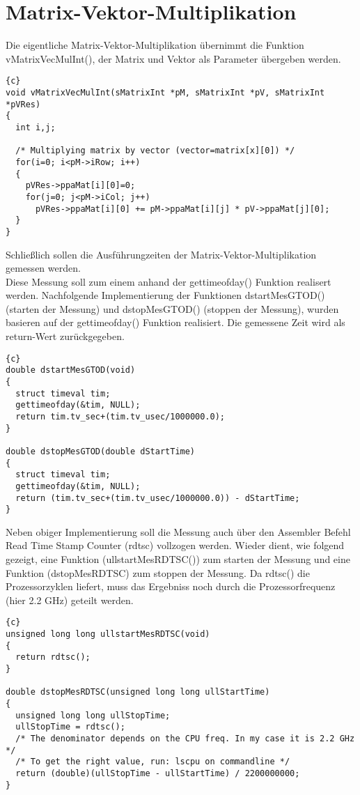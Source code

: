 \documentclass{article}
\newcommand{\enterProblemHeader}[1]{
}
\newcommand{\exitProblemHeader}[1]{
}
\newcounter{homeworkProblemCounter} %
\newcommand{\homeworkProblemName}{}
\newenvironment{homeworkProblem}[1][Problem \arabic{homeworkProblemCounter}]{ %
\stepcounter{homeworkProblemCounter} %
\renewcommand{\homeworkProblemName}{#1} %
\section{\homeworkProblemName} %
}{
}
\begin{document}
\begin{homeworkProblem}[Matrix-Vektor-Multiplikation]
Die eigentliche Matrix-Vektor-Multiplikation übernimmt die Funktion vMatrixVecMulInt(),
der Matrix und Vektor als Parameter übergeben werden.
\begin{lstlisting}{c}
void vMatrixVecMulInt(sMatrixInt *pM, sMatrixInt *pV, sMatrixInt *pVRes)
{
  int i,j;
  
  /* Multiplying matrix by vector (vector=matrix[x][0]) */
  for(i=0; i<pM->iRow; i++)
  {
    pVRes->ppaMat[i][0]=0;
    for(j=0; j<pM->iCol; j++)
      pVRes->ppaMat[i][0] += pM->ppaMat[i][j] * pV->ppaMat[j][0];
  }
}
\end{lstlisting}
Schließlich sollen die Ausführungzeiten der Matrix-Vektor-Multiplikation gemessen werden.
\\
Diese Messung soll zum einem anhand der gettimeofday() Funktion realisert werden. Nachfolgende
Implementierung der Funktionen dstartMesGTOD() (starten der Messung) und dstopMesGTOD()
(stoppen der Messung), wurden basieren auf der gettimeofday() Funktion realisiert. Die
gemessene Zeit wird als return-Wert zurückgegeben.
\begin{lstlisting}{c}
double dstartMesGTOD(void)
{
  struct timeval tim;
  gettimeofday(&tim, NULL);
  return tim.tv_sec+(tim.tv_usec/1000000.0);
}

double dstopMesGTOD(double dStartTime)
{
  struct timeval tim;
  gettimeofday(&tim, NULL);
  return (tim.tv_sec+(tim.tv_usec/1000000.0)) - dStartTime;
}
\end{lstlisting}
Neben obiger Implementierung soll die Messung auch über den Assembler Befehl Read Time
Stamp Counter (rdtsc) vollzogen werden. Wieder dient, wie folgend gezeigt, eine Funktion
(ullstartMesRDTSC()) zum starten der Messung und eine Funktion (dstopMesRDTSC) zum stoppen
der Messung. Da rdtsc() die Prozessorzyklen liefert, muss das Ergebniss noch durch die 
Prozessorfrequenz (hier 2.2 GHz) geteilt werden.
\begin{lstlisting}{c}
unsigned long long ullstartMesRDTSC(void)
{
  return rdtsc();
}

double dstopMesRDTSC(unsigned long long ullStartTime)
{
  unsigned long long ullStopTime;
  ullStopTime = rdtsc();
  /* The denominator depends on the CPU freq. In my case it is 2.2 GHz */
  /* To get the right value, run: lscpu on commandline */
  return (double)(ullStopTime - ullStartTime) / 2200000000;
}
\end{lstlisting}

\end{homeworkProblem}
\end{document}
